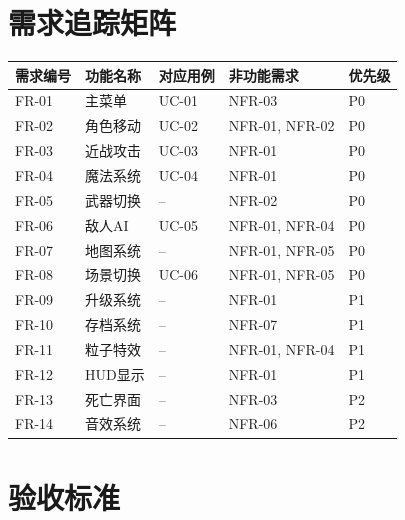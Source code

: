 \documentclass[12pt,a4paper]{article}
\begin{document}
\section{需求追踪矩阵}

\begin{longtable}{p{1.5cm}p{2cm}p{2.5cm}p{2cm}p{2cm}}
\toprule
\textbf{需求编号} & \textbf{功能名称} & \textbf{对应用例} & \textbf{非功能需求} & \textbf{优先级} \\
\midrule
\endhead
FR-01 & 主菜单 & UC-01 & NFR-03 & P0 \\
FR-02 & 角色移动 & UC-02 & NFR-01, NFR-02 & P0 \\
FR-03 & 近战攻击 & UC-03 & NFR-01 & P0 \\
FR-04 & 魔法系统 & UC-04 & NFR-01 & P0 \\
FR-05 & 武器切换 & -- & NFR-02 & P0 \\
FR-06 & 敌人AI & UC-05 & NFR-01, NFR-04 & P0 \\
FR-07 & 地图系统 & -- & NFR-01, NFR-05 & P0 \\
FR-08 & 场景切换 & UC-06 & NFR-01, NFR-05 & P0 \\
FR-09 & 升级系统 & -- & NFR-01 & P1 \\
FR-10 & 存档系统 & -- & NFR-07 & P1 \\
FR-11 & 粒子特效 & -- & NFR-01, NFR-04 & P1 \\
FR-12 & HUD显示 & -- & NFR-01 & P1 \\
FR-13 & 死亡界面 & -- & NFR-03 & P2 \\
FR-14 & 音效系统 & -- & NFR-06 & P2 \\
\bottomrule
\end{longtable}


\section{验收标准}
\end{document}
